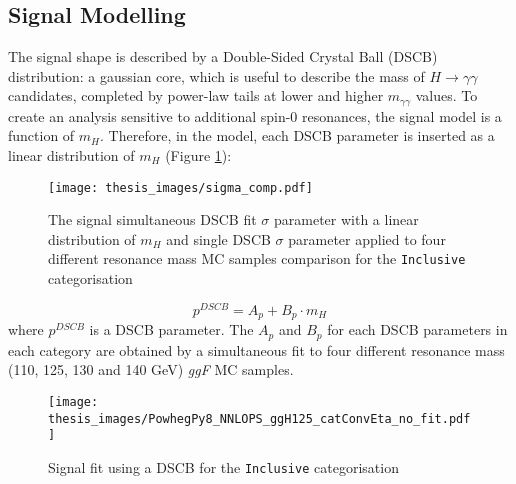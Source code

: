 \documentclass[a4paper, oneside, 11pt, openright]{book}
\begin{document}
 			\subsection{Signal Modelling}
 				The signal shape is described by a Double-Sided Crystal Ball (DSCB) distribution: a gaussian core, which is useful to describe the mass of $H\to\gamma\gamma$ candidates, completed by power-law tails at lower and higher $m_{\gamma\gamma}$ values. To create an analysis sensitive to additional spin-0 resonances, the signal model is a function of $m_H$. Therefore, in the model, each DSCB parameter is inserted as a linear distribution of $m_H$ (Figure \ref{fig:sigma_fit}):
 				\begin{figure}
 					\centering
 					\texttt{[image: thesis\_images/sigma\_comp.pdf]}
 					\caption{The signal simultaneous DSCB fit $\sigma$ parameter with a linear distribution of $m_H$ and single DSCB $\sigma$ parameter applied to four different resonance mass MC samples comparison for the \texttt{Inclusive} categorisation}
 					\label{fig:sigma_fit}
 				\end{figure}
 				\begin{equation}\label{eq:DSCB_par}
 					p^{DSCB} = A_p + B_p\cdot m_H
 				\end{equation}
 				where $p^{DSCB}$ is a DSCB parameter. The $A_p$ and $B_p$ for each DSCB parameters in each category are obtained by a simultaneous fit to four different resonance mass (110, 125, 130 and 140 GeV) \textit{ggF} MC samples.
 				\begin{figure}
 					\centering
 					\texttt{[image: thesis\_images/PowhegPy8\_NNLOPS\_ggH125\_catConvEta\_no\_fit.pdf]}
 					\caption{Signal fit using a DSCB for the \texttt{Inclusive} categorisation}
 					\label{fig:sig_fit}
 				\end{figure}
 				
\end{document}

